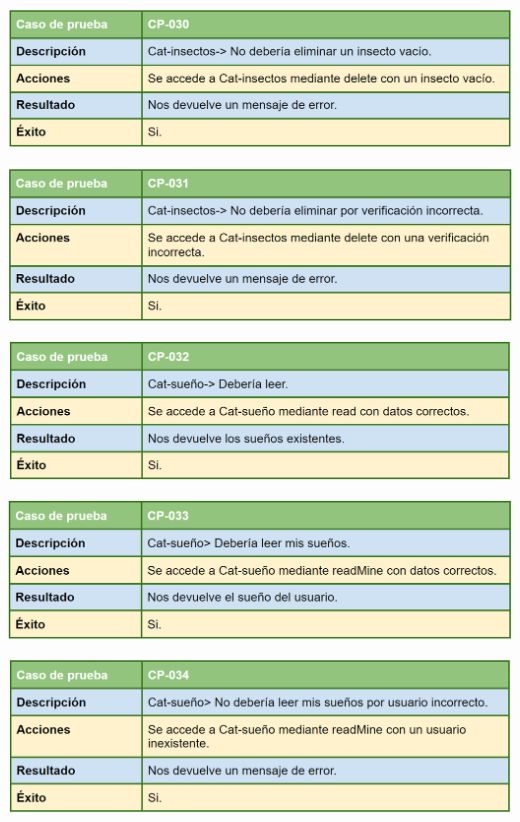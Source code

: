 \bigskip

\includegraphics[width=\textwidth]{img/cap7/cp-030.png}

\bigskip

\includegraphics[width=\textwidth]{img/cap7/cp-031.png}

\bigskip

\includegraphics[width=\textwidth]{img/cap7/cp-032.png}

\bigskip

\includegraphics[width=\textwidth]{img/cap7/cp-033.png}

\bigskip

\includegraphics[width=\textwidth]{img/cap7/cp-034.png}

